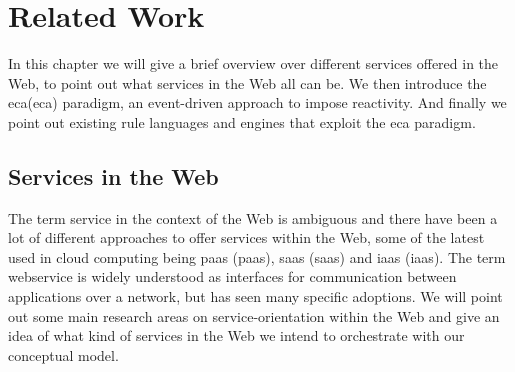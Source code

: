 
\chapter{Related Work}

In this chapter we will give a brief overview over different services offered in the Web, to point out what services in the Web all can be.
We then introduce the \textrm{\acrlong{eca}(\acrshort{eca})} paradigm, an event-driven approach to impose reactivity.
And finally we point out existing rule languages and engines that exploit the \textrm{\acrshort{eca}} paradigm.

\section{Services in the Web}
The term service in the context of the Web is ambiguous and there have been a lot of different approaches to offer services within the Web, some of the latest used in cloud computing being \textrm{\acrlong{paas} (\acrshort{paas})}, \textrm{\acrlong{saas} (\acrshort{saas})} and \textrm{\acrlong{iaas} (\acrshort{iaas})}.
The term \textrm{\gls{webservice}} is widely understood as interfaces for communication between applications over a network, but has seen many specific adoptions.
We will point out some main research areas on service-orientation within the Web and give an idea of what kind of services in the Web we intend to orchestrate with our conceptual model.

